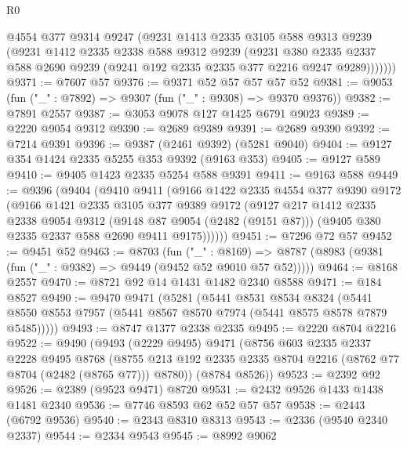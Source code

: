 \begin{lexlean}{R0}
\begin{coremodule}
          @4554
          @377
          @9314
          @9247
          (@9231
            @1413
            @2335
            @3105
            @588
            @9313
            @9239
            (@9231
              @1412
              @2335
              @2338
              @588
              @9312
              @9239
              (@9231
                @380
                @2335
                @2337
                @588
                @2690
                @9239
                (@9241 @192 @2335 @2335 @377 @2216 @9247 @9289)))))))
@9371 := @7607 @57
@9376 := @9371 @52 @57 @57 @57 @52
@9381 := @9053 (fun ("_" : @7892) => @9307 (fun ("_" : @9308) => @9370 @9376))
@9382 := @7891 @2557
@9387 := @3053 @9078 @127 @1425 @6791 @9023
@9389 := @2220 @9054 @9312
@9390 := @2689 @9389
@9391 := @2689 @9390
@9392 := @7214 @9391
@9396 := @9387 (@2461 @9392) (@5281 @9040)
@9404 := @9127 @354 @1424 @2335 @5255 @353 @9392 (@9163 @353)
@9405 := @9127 @589
@9410 := @9405 @1423 @2335 @5254 @588 @9391
@9411 := @9163 @588
@9449 := @9396
    (@9404
      (@9410
        @9411
        (@9166
          @1422
          @2335
          @4554
          @377
          @9390
          @9172
          (@9166
            @1421
            @2335
            @3105
            @377
            @9389
            @9172
            (@9127
              @217
              @1412
              @2335
              @2338
              @9054
              @9312
              (@9148 @87 @9054 (@2482 (@9151 @87)))
              (@9405 @380 @2335 @2337 @588 @2690 @9411 @9175))))))
@9451 := @7296 @72 @57
@9452 := @9451 @52
@9463 := @8703
    (fun ("_" : @8169) =>
    @8787 (@8983 (@9381 (fun ("_" : @9382) => @9449 (@9452 @52 @9010 @57 @52)))))
@9464 := @8168 @2557
@9470 := @8721 @92 @14 @1431 @1482 @2340 @8588
@9471 := @184 @8527
@9490 := @9470
    @9471
    (@5281
      (@5441
        @8531
        @8534
        @8324
        (@5441 @8550 @8553 @7957 (@5441 @8567 @8570 @7974 (@5441 @8575 @8578 @7879 @5485)))))
@9493 := @8747 @1377 @2338 @2335
@9495 := @2220 @8704 @2216
@9522 := @9490
    (@9493
      (@2229 @9495)
      @9471
      (@8756
        @603
        @2335
        @2337
        @2228
        @9495
        @8768
        (@8755 @213 @192 @2335 @2335 @8704 @2216 (@8762 @77 @8704 (@2482 (@8765 @77))) @8780))
      (@8784 @8526))
@9523 := @2392 @92
@9526 := @2389 (@9523 @9471) @8720
@9531 := @2432 @9526 @1433 @1438 @1481 @2340
@9536 := @7746 @8593 @62 @52 @57 @57
@9538 := @2443 (@6792 @9536)
@9540 := @2343 @8310 @8313
@9543 := @2336 (@9540 @2340 @2337)
@9544 := @2334 @9543
@9545 := @8992 @9062

\end{coremodule}
\end{lexlean}
